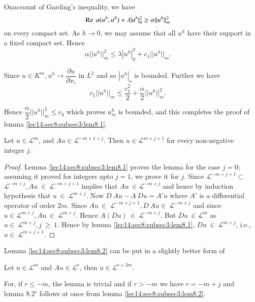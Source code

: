 On\pageoriginale account of Garding's inequality, we have 
$$
\operatorname{Re}  ~ a(u^h,u^h) + \lambda | u^h |^2_0 \ge \alpha || u^h ||^2_m
$$
on every compact set. As $h \rightarrow 0$, we may assume that all
$u^h$ have their support in a fixed compact set. Hence 
$$
\alpha || u^h ||^2_m \le \lambda | u^h |^2_0 + c_1 || u^h ||_m.
$$

\noindent
Since $u \in K^m, u^h \rightarrow \dfrac{\partial u}{\partial
  x_i}$ in $L^2$ and so $| u^h |_o$ is bounded. Further we have 
$$
c_1 || u^h ||_m \le \frac{c_1^2}{2} + \frac{\alpha}{2} || u^h ||^2_m.
$$

Hence $\dfrac{\alpha}{2}|| u^h ||^2_m\le c_3$ which proves $u^h _m$
is bounded, and this completes the proof of lemma \ref{lec14:sec8:subsec3:lem8.1}.  

\begin{lemma}\label{lec14:sec8:subsec3:lem8.2}%
  Let $u \in \mathscr{L}^m$, and $Au \in
  \mathscr{L}^{-m+1+j}$.  Then $u \in \mathscr{L}^{m+j+1}$ for
  every non-negative integer $j$. 
\end{lemma}

\begin{proof}%
  Lemma \ref{lec14:sec8:subsec3:lem8.1} proves the lemma for the case $j =0$; assuming it proved
  for integers upto $j = 1$, we prove it for $j$. Since
  $\mathscr{L}^{-m+j+1}  \subset$ $\mathscr{L}^{-m+j}, Au ~ \in
  ~ \mathscr{L}^{-m+j+1}$ implies that $Au ~ \in
  \mathscr{L}^{-m+j}$ and hence by induction hypothesis that $u ~
  \in ~ \mathscr{L}^{m+j}$. Now $D ~ Au - A ~ Du = A'u$ where
  $A'$ is a differential operator of order $2m$. Since $Au ~ \in
  ~ \mathscr{L}^{-m+j+1}, D ~ Au \in ~ \mathscr{L}^{-m+j}$ and
  since $u \in \mathscr{L}^{m+j}, Au ~\in ~
  \mathscr{L}^{m+j}$. Hence $A(Du) ~ \in ~
  \mathscr{L}^{-m+j}$. But $Du ~ \in \mathscr{L}^m$ as $u
  \in ~ \mathscr{L}^{m+j}, j ~ \ge ~ 1$. Hence by lemma \ref{lec14:sec8:subsec3:lem8.1},
  $Du ~ \in ~ \mathscr{L}^{m+j}$, i.e., $u \in ~
  \mathscr{L}^{m+j+1}$. 
\end{proof}

Lemma \ref{lec14:sec8:subsec3:lem8.2} can be put in a slightly better form of 

\begin{lemma*}[{\boldmath{$8.2'$}}]
  Let $u \in \mathscr{L}^{m}$ and $Au \in \mathscr{L}^r$, then $u \in \mathscr{L}^{r+2m}$. 
\end{lemma*}

For, if $r \le -m$, the lemma is trivial and if $r > -m$ we have $r =
- m+j$ and lemma $8.2'$ follows at once from lemma \ref{lec14:sec8:subsec3:lem8.2}. 

